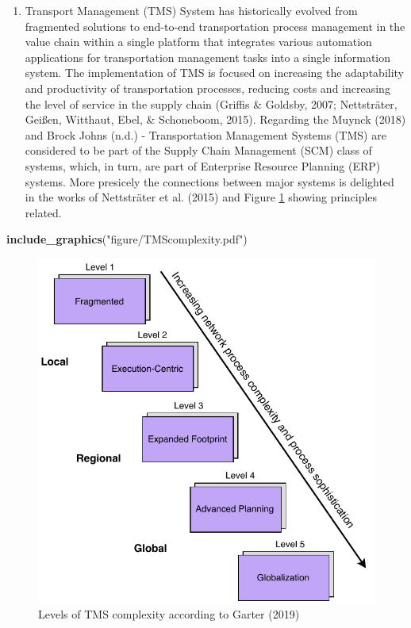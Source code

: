 \documentclass[12pt,twoside]{reedthesis}
\newenvironment{Shaded}{\begin{snugshade}}{\end{snugshade}}
\newcommand{\KeywordTok}[1]{\textcolor[rgb]{0.13,0.29,0.53}{\textbf{#1}}}
\newcommand{\NormalTok}[1]{#1}
\newcommand{\StringTok}[1]{\textcolor[rgb]{0.31,0.60,0.02}{#1}}
\providecommand{\tightlist}{%
  \setlength{\itemsep}{0pt}\setlength{\parskip}{0pt}}
\begin{document}
\begin{enumerate}
\def\labelenumi{\arabic{enumi}.}
\setcounter{enumi}{2}
\tightlist
\item
  Transport Management (TMS) System has historically evolved from fragmented solutions to end-to-end transportation process management in the value chain within a single platform that integrates various automation applications for transportation management tasks into a single information system. The implementation of TMS is focused on increasing the adaptability and productivity of transportation processes, reducing costs and increasing the level of service in the supply chain (Griffis \& Goldsby, 2007; Nettsträter, Geißen, Witthaut, Ebel, \& Schoneboom, 2015). Regarding the Muynck (2018) and Brock Johns (n.d.) - Transportation Management Systems (TMS) are considered to be part of the Supply Chain Management (SCM) class of systems, which, in turn, are part of Enterprise Resource Planning (ERP) systems. More presicely the connections between major systems is delighted in the works of Nettsträter et al. (2015) and Figure \ref{fig:tmscomplexity} showing principles related.
\end{enumerate}
\begin{Shaded}
\begin{Highlighting}[]
\KeywordTok{include_graphics}\NormalTok{(}\StringTok{"figure/TMScomplexity.pdf"}\NormalTok{)}
\end{Highlighting}
\end{Shaded}
\begin{figure}[h]

{\centering \includegraphics[width=0.9\linewidth,]{figure/TMScomplexity} 

}

\caption{Levels of TMS complexity according to Garter (2019)}\label{fig:tmscomplexity}
\end{figure}
\end{document}
